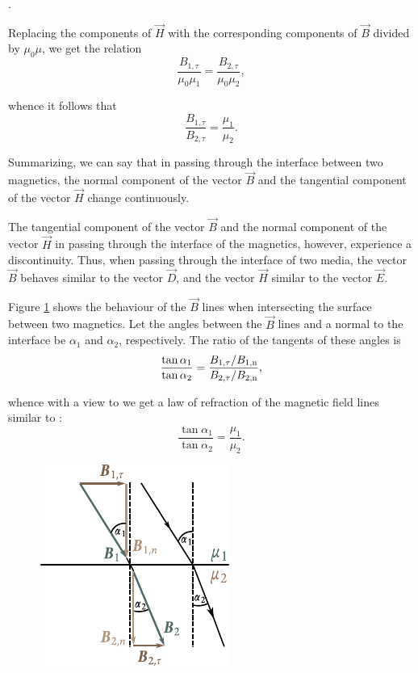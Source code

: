 .

Replacing the components of $\vec{H}$ with the corresponding components of $\vec{B}$ divided by $\mu_0\mu$, we get the relation
\begin{equation*}
    \frac{B_{1,\tau}}{\mu_0\mu_1} = \frac{B_{2,\tau}}{\mu_0\mu_2},
\end{equation*}

\noindent
whence it follows that
\begin{equation}\label{eq:7_36}
    \frac{B_{1,\tau}}{B_{2,\tau}} = \frac{\mu_1}{\mu_2}.
\end{equation}

Summarizing, we can say that in passing through the interface between two magnetics, the normal component of the vector $\vec{B}$ and the tangential component of the vector $\vec{H}$ change continuously.

The tangential component of the vector $\vec{B}$ and the normal component of the vector $\vec{H}$ in passing through the interface of the magnetics, however, experience a discontinuity.
Thus, when passing through the interface of two media, the vector $\vec{B}$ behaves similar to the vector $\vec{D}$, and the vector $\vec{H}$ similar to the vector $\vec{E}$.

Figure \ref{fig:7_7} shows the behaviour of the $\vec{B}$ lines when intersecting the surface between two magnetics.
Let the angles between the $\vec{B}$ lines and a normal to the interface be $\alpha_1$ and $\alpha_2$, respectively.
The ratio of the tangents of these angles is
\begin{equation*}
    \frac{\tan{\alpha_1}}{\tan{\alpha_2}} = \frac{B_{1,\tau}/B_{\text{$1$,n}}}{B_{2,\tau}/B_{\text{$2$,n}}},
\end{equation*}

\noindent
whence with a view to  we get a law of refraction of the magnetic field lines similar to :
\begin{equation}\label{eq:7_37}
    \frac{\tan{\alpha_1}}{\tan{\alpha_2}} = \frac{\mu_1}{\mu_2}.
\end{equation}

\begin{figure}[t]
	\begin{center}
		\includegraphics[scale=1.1]{figures/ch_07/fig_7_7.pdf}
		\caption[]{}
		\label{fig:7_7}
	\end{center}
	\vspace{-0.8cm}
\end{figure}

